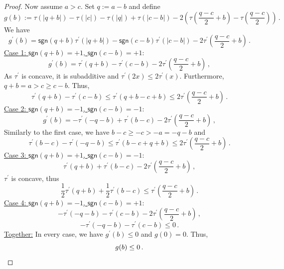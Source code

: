 \documentclass{article}
\newcommand{\lb}{\left(} %
\newcommand{\rb}{\right)} %
\newcommand{\br}[1]{\lb #1 \rb} %
\newcommand{\brOf}[1]{\!\br{#1}} %
\newcommand{\pr}{^\prime}
\newcommand{\sgn}{\mathsf{sgn}} %
\newcommand{\equationFullstop}{\, .}
\newcommand{\eqfs}{\equationFullstop}
\newcommand{\equationComma}{\, ,}
\newcommand{\eqcm}{\equationComma}
\newcommand{\tran}{\tau}
\newcommand{\dtran}{\tran\pr}
\begin{document}
\begin{appendix}
\begin{proof}
	Now assume $a>c$.
	Set $q := a-b$ and define
	\begin{equation*}
		g(b) :=  \tran(|q+b|) - \tran(|c|) - \tran(|q|) + \tran(|c-b|) - 2\br{\tran\brOf{\frac{q-c}{2}+b}-\tran\brOf{\frac{q-c}{2}}}
		\eqfs
	\end{equation*}
	We have
	\begin{equation*}
		g\pr(b) = \sgn(q+b)\dtran(|q+b|) - \sgn(c-b)\dtran(|c-b|) - 2\dtran\brOf{\frac{q-c}{2}+b}
		\eqfs
	\end{equation*}
	\underline{Case 1: $\sgn(q+b) = +1$, $\sgn(c-b)=+1$}:
	\begin{equation*}
		g\pr(b) = \dtran(q+b) - \dtran(c-b) - 2\dtran\brOf{\frac{q-c}{2}+b}
		\eqcm
	\end{equation*}
	As $\dtran$ is concave, it is subadditive and $\dtran(2x)\leq2\dtran(x)$. Furthermore, $q+b  = a > c \geq  c-b$. Thus, 
	\begin{equation*}
		\dtran(q+b) - \dtran(c-b) \leq \dtran(q+b-c+b) \leq 2\dtran\brOf{\frac{q-c}{2}+b}
		\eqfs
	\end{equation*}
	\underline{Case 2: $\sgn(q+b) = -1$, $\sgn(c-b)=-1$}:
	\begin{equation*}
		g\pr(b) = -\dtran(-q-b) + \dtran(b - c) - 2\dtran\brOf{\frac{q-c}{2}+b}
		\eqcm
	\end{equation*}
	Similarly to the first case, we have $b - c \geq -c > - a = - q - b$ and
	\begin{equation*}
		\dtran(b - c)-\dtran(-q-b) \leq  \dtran(b - c + q + b) \leq 2\dtran\brOf{\frac{q-c}{2}+b}
		\eqfs
	\end{equation*}
	\underline{Case 3: $\sgn(q+b) = +1$, $\sgn(c-b)=-1$}:
	\begin{equation*}
		\dtran(q+b) + \dtran(b-c) - 2\dtran\brOf{\frac{q-c}{2}+b}
		\eqcm
	\end{equation*}
	$\dtran$ is concave, thus
	\begin{equation*}
		\frac 12 \dtran(q+b) + \frac 12 \dtran(b-c) \leq \dtran\brOf{\frac{q-c}{2}+b}
		\eqfs
	\end{equation*}
	\underline{Case 4: $\sgn(q+b) = -1$, $\sgn(c-b)=+1$}:
	\begin{equation*}
		-\dtran(-q-b) - \dtran(c-b) - 2\dtran\brOf{\frac{q-c}{2}+b}
		\eqcm
	\end{equation*}
	\begin{equation*}
		-\dtran(-q-b)-\dtran(c-b) \leq 0
		\eqfs
	\end{equation*}
	\underline{Together:}
	In every case, we have $g\pr(b) \leq 0$ and $g(0)=0$. Thus, 
	\begin{equation*}
		g(b) \leq 0
		\eqfs
		\qedhere
	\end{equation*}
\end{proof}
%
%
%
%
%
%
%
%

\end{appendix}
\end{document}
